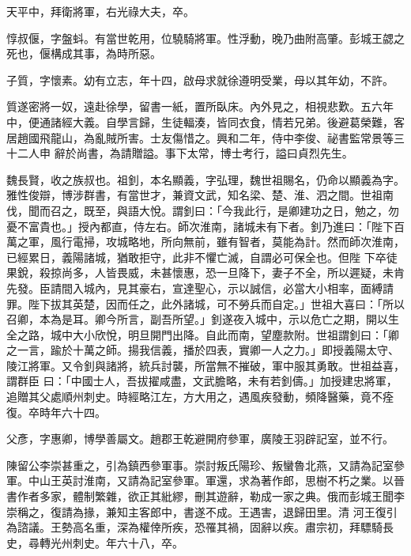 \begin{pinyinscope}
 天平中，拜衛將軍，右光祿大夫，卒。



 惇叔偃，字盤蚪。有當世乾用，位驍騎將軍。性浮動，晚乃曲附高肇。彭城王勰之死也，偃構成其事，為時所惡。



 子質，字懷素。幼有立志，年十四，啟母求就徐遵明受業，母以其年幼，不許。



 質遂密將一奴，遠赴徐學，留書一紙，置所臥床。內外見之，相視悲歎。五六年中，便通諸經大義。自學言歸，生徒輻湊，皆同衣食，情若兄弟。後避葛榮難，客居趙國飛龍山，為亂賊所害。士友傷惜之。興和二年，侍中李俊、祕書監常景等三十二人申
 辭於尚書，為請贈謚。事下太常，博士考行，謚曰貞烈先生。



 魏長賢，收之族叔也。祖釗，本名顯義，字弘理，魏世祖賜名，仍命以顯義為字。雅性俊辯，博涉群書，有當世才，兼資文武，知名梁、楚、淮、泗之間。世祖南伐，聞而召之，既至，與語大悅。謂釗曰：「今我此行，是卿建功之日，勉之，勿憂不富貴也。」授內都直，侍左右。師次淮南，諸城未有下者。釗乃進曰：「陛下百萬之軍，風行電掃，攻城略地，所向無前，雖有智者，莫能為計。然而師次淮南，已經累日，義陽諸城，猶敢拒守，此非不懼亡滅，自謂必可保全也。但陛
 下卒徒果銳，殺掠尚多，人皆畏威，未甚懷惠，恐一旦降下，妻子不全，所以遲疑，未肯先發。臣請間入城內，見其豪右，宣達聖心，示以誠信，必當大小相率，面縛請罪。陛下拔其英楚，因而任之，此外諸城，可不勞兵而自定。」世祖大喜曰：「所以召卿，本為是耳。卿今所言，副吾所望。」釗遂夜入城中，示以危亡之期，開以生全之路，城中大小欣悅，明旦開門出降。自此而南，望塵款附。世祖謂釗曰：「卿之一言，踰於十萬之師。揚我信義，播於四表，實卿一人之力。」即授義陽太守、陵江將軍。又令釗與諸將，統兵討襲，所當無不摧破，軍中服其勇敢。世祖益喜，謂群臣
 曰：「中國士人，吾拔擢咸盡，文武膽略，未有若釗儔。」加授建忠將軍，追贈其父處順州刺史。時經略江左，方大用之，遇風疾發動，頻降醫藥，竟不痊復。卒時年六十四。



 父彥，字惠卿，博學善屬文。趙郡王乾避開府參軍，廣陵王羽辟記室，並不行。



 陳留公李崇甚重之，引為鎮西參軍事。崇討叛氏陽珍、叛蠻魯北燕，又請為記室參軍。中山王英討淮南，又請為記室參軍。軍還，求為著作郎，思樹不朽之業。以晉書作者多家，體制繁雜，欲正其紕繆，刪其遊辭，勒成一家之典。俄而彭城王聞李崇稱之，復請為掾，兼知主客郎中，書遂不成。王遇害，退歸田里。清
 河王復引為諮議。王勢高名重，深為權倖所疾，恐罹其禍，固辭以疾。肅宗初，拜驃騎長史，尋轉光州刺史。年六十八，卒。




\end{pinyinscope}

